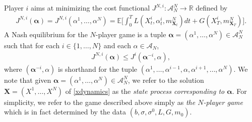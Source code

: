 \documentclass[11pt,reqno]{amsart}
\numberwithin{equation}{section}
\theoremstyle{definition}
\def\E{{\mathbb E}}
\def\R{{\mathbb R}}
\newcommand{\bX}{\mathbf{X}}
\newcommand{\sA}{\mathcal{A}}
\def \E{\mathbb{E}}
\def \R{\mathbb{R}}
\begin{document}
Player $i$ aims at minimizing the cost functional $J^{N,i} : \sA_N^N \to \R$ defined by
\begin{align} \label{nplayerobj}
  J^{N,i}(\bm \alpha) =  J^{N,i}(\alpha^1,\dots,\alpha^N) = \E\bigg[ \int_0^T L(X_t^i, \alpha_t^i, m_{\bX_t}^N) dt + G(X_T^i, m_{\bX_T}^N) \bigg].
\end{align}
A Nash equilibrium for the $N$-player game is a tuple $\bm \alpha = (\alpha^1,\dots,\alpha^N) \in \sA_N^N$ such that for each $i \in \{1,\dots,N\}$ and each $\alpha \in \sA_N$, 
\begin{align*}
J^{N,i}(\bm \alpha ) \leq J^i(\bm \alpha^{-i}, \alpha), 
\end{align*}
where $(\bm \alpha^{-i}, \alpha)$ is shorthand for the tuple $(\alpha^1,\dots,\alpha^{i-1}, \alpha, \alpha^{i+1},\dots,\alpha^N)$. We note that given $\bm \alpha = (\alpha^1,\dots,\alpha^N) \in \sA_N^N$, we refer to the solution $\bX = (X^1,\dots,X^N)$ of \eqref{xdynamics} as the \textit{state process corresponding to $\bm \alpha$}. For simplicity, we refer to the game described above simply as \textit{the $N$-player game } which is in fact determined by the data $(b,\sigma, \sigma^0, L,G,  m_0)$.  
\end{document}
